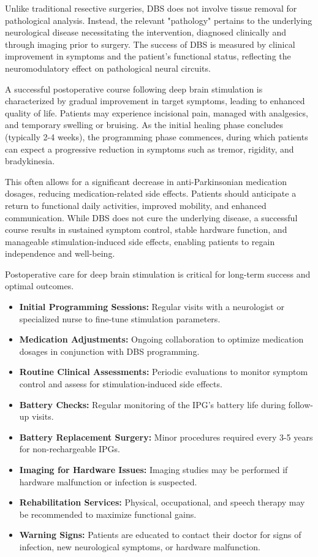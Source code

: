 Unlike traditional resective surgeries, DBS does not involve tissue removal for pathological analysis. Instead, the relevant "pathology" pertains to the underlying neurological disease necessitating the intervention, diagnosed clinically and through imaging prior to surgery. The success of DBS is measured by clinical improvement in symptoms and the patient's functional status, reflecting the neuromodulatory effect on pathological neural circuits.

A successful postoperative course following deep brain stimulation is characterized by gradual improvement in target symptoms, leading to enhanced quality of life. Patients may experience incisional pain, managed with analgesics, and temporary swelling or bruising. As the initial healing phase concludes (typically 2-4 weeks), the programming phase commences, during which patients can expect a progressive reduction in symptoms such as tremor, rigidity, and bradykinesia.

This often allows for a significant decrease in anti-Parkinsonian medication dosages, reducing medication-related side effects. Patients should anticipate a return to functional daily activities, improved mobility, and enhanced communication. While DBS does not cure the underlying disease, a successful course results in sustained symptom control, stable hardware function, and manageable stimulation-induced side effects, enabling patients to regain independence and well-being.

Postoperative care for deep brain stimulation is critical for long-term success and optimal outcomes.

\begin{itemize}
  \item \textbf{Initial Programming Sessions:} Regular visits with a neurologist or specialized nurse to fine-tune stimulation parameters.
  \item \textbf{Medication Adjustments:} Ongoing collaboration to optimize medication dosages in conjunction with DBS programming.
  \item \textbf{Routine Clinical Assessments:} Periodic evaluations to monitor symptom control and assess for stimulation-induced side effects.
  \item \textbf{Battery Checks:} Regular monitoring of the IPG's battery life during follow-up visits.
  \item \textbf{Battery Replacement Surgery:} Minor procedures required every 3-5 years for non-rechargeable IPGs.
  \item \textbf{Imaging for Hardware Issues:} Imaging studies may be performed if hardware malfunction or infection is suspected.
  \item \textbf{Rehabilitation Services:} Physical, occupational, and speech therapy may be recommended to maximize functional gains.
  \item \textbf{Warning Signs:} Patients are educated to contact their doctor for signs of infection, new neurological symptoms, or hardware malfunction.
\end{itemize}

